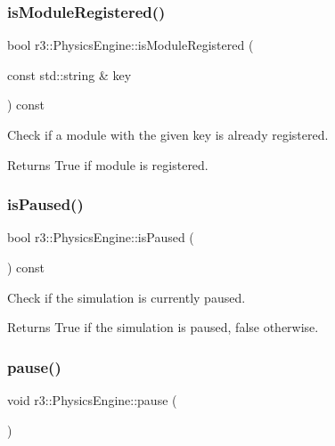\subsubsection{\texorpdfstring{is\+Module\+Registered()}{isModuleRegistered()}}
{\footnotesize\ttfamily bool r3\+::\+Physics\+Engine\+::is\+Module\+Registered (\begin{DoxyParamCaption}\item[{const std\+::string \&}]{key }\end{DoxyParamCaption}) const}

Check if a module with the given key is already registered. \begin{DoxyReturn}{Returns}
True if module is registered. 
\end{DoxyReturn}
\mbox{\label{classr3_1_1_physics_engine_a8978c7f4626cb0c69a79456c304323d2}} 
\subsubsection{\texorpdfstring{is\+Paused()}{isPaused()}}
{\footnotesize\ttfamily bool r3\+::\+Physics\+Engine\+::is\+Paused (\begin{DoxyParamCaption}{ }\end{DoxyParamCaption}) const}



Check if the simulation is currently paused. 

\begin{DoxyReturn}{Returns}
True if the simulation is paused, false otherwise. 
\end{DoxyReturn}
\mbox{\label{classr3_1_1_physics_engine_a6ed605620a6f115f014d3940dc2a5487}} 
\subsubsection{\texorpdfstring{pause()}{pause()}}
{\footnotesize\ttfamily void r3\+::\+Physics\+Engine\+::pause (\begin{DoxyParamCaption}{ }\end{DoxyParamCaption})}




